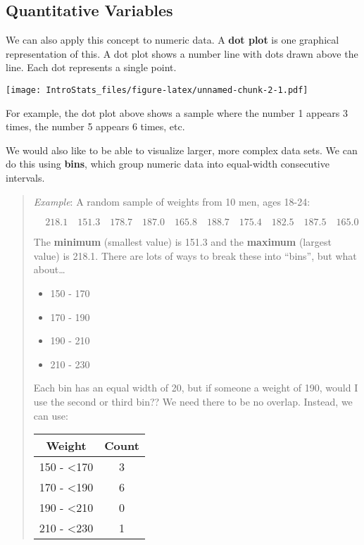 \documentclass[
]{book}
\providecommand{\tightlist}{%
  \setlength{\itemsep}{0pt}\setlength{\parskip}{0pt}}
\begin{document}
\hypertarget{quantitative-variables}{%
\subsection{Quantitative Variables}\label{quantitative-variables}}

We can also apply this concept to numeric data. A \textbf{dot plot} is one graphical representation of this. A dot plot shows a number line with dots drawn above the line. Each dot represents a single point.

\texttt{[image: IntroStats\_files/figure-latex/unnamed-chunk-2-1.pdf]}

For example, the dot plot above shows a sample where the number 1 appears 3 times, the number 5 appears 6 times, etc.

We would also like to be able to visualize larger, more complex data sets. We can do this using \textbf{bins}, which group numeric data into equal-width consecutive intervals.

\begin{quote}
\emph{Example}: A random sample of weights from 10 men, ages 18-24:

\[\quad 218.1 \quad 151.3 \quad 178.7 \quad 187.0 \quad   165.8 \quad 188.7 \quad 175.4 \quad 182.5 \quad 187.5 \quad 165.0\]

The \textbf{minimum} (smallest value) is 151.3 and the \textbf{maximum} (largest value) is 218.1. There are lots of ways to break these into ``bins'', but what about\ldots{}

\begin{itemize}
\tightlist
\item
  150 - 170
\item
  170 - 190
\item
  190 - 210
\item
  210 - 230
\end{itemize}

Each bin has an equal width of 20, but if someone a weight of 190, would I use the second or third bin?? We need there to be no overlap. Instead, we can use:

\begin{longtable}[]{@{}cc@{}}
\toprule
Weight & Count \\
\midrule
\endhead
150 - \textless170 & 3 \\
170 - \textless190 & 6 \\
190 - \textless210 & 0 \\
210 - \textless230 & 1 \\
\bottomrule
\end{longtable}
\end{quote}
\end{document}
